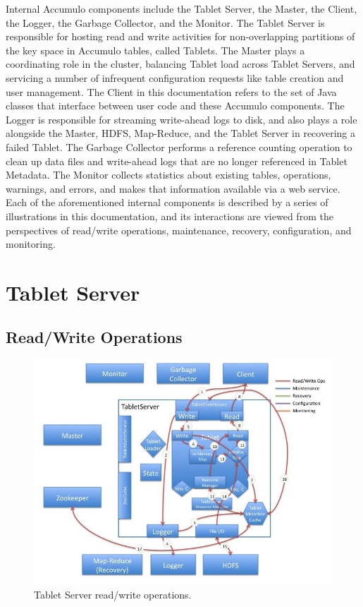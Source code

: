 \documentclass[letterpaper,onecolumn,12pt,titlepage]{article}
\begin{document}
Internal Accumulo components include the Tablet Server, the Master, the Client, the Logger, the Garbage Collector, and the Monitor.
The Tablet Server is responsible for hosting read and write activities for non-overlapping partitions of the key space in Accumulo tables, called Tablets.
The Master plays a coordinating role in the cluster, balancing Tablet load across Tablet Servers, and servicing a number of infrequent configuration requests like table creation and user management.
The Client in this documentation refers to the set of Java classes that interface between user code and these Accumulo components.
The Logger is responsible for streaming write-ahead logs to disk, and also plays a role alongside the Master, HDFS, Map-Reduce, and the Tablet Server in recovering a failed Tablet.
The Garbage Collector performs a reference counting operation to clean up data files and write-ahead logs that are no longer referenced in Tablet Metadata.
The Monitor collects statistics about existing tables, operations, warnings, and errors, and makes that information available via a web service.
Each of the aforementioned internal components is described by a series of illustrations in this documentation, and its interactions are viewed from the perspectives of read/write operations, maintenance, recovery, configuration, and monitoring.

\section{Tablet Server}

\subsection{Read/Write Operations}
\begin{figure}[htbp]
\center
\includegraphics[scale=.6]{images/tserver_rw.jpg}
\caption{\label{fig_ts_rw} Tablet Server read/write operations.}
\end{figure}
\end{document}

